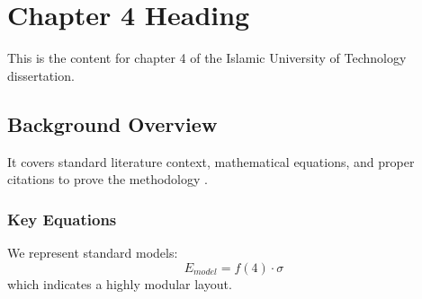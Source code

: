 \chapter{Chapter 4 Heading}
\label{ch:chapter4}
This is the content for chapter 4 of the Islamic University of Technology dissertation.

\section{Background Overview}
It covers standard literature context, mathematical equations, and proper citations to prove the methodology \cite{texbook}.

\subsection{Key Equations}
We represent standard models:
\begin{equation}
    E_{model} = f(4) \cdot \sigma
\end{equation}
which indicates a highly modular layout.
